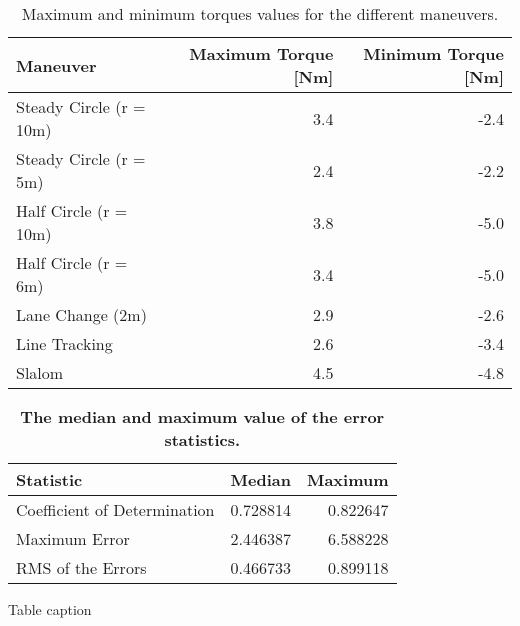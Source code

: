 \documentclass[10pt]{article}
\begin{document}
\begin{table}[!ht]
  \caption{Maximum and minimum torques values for the different maneuvers.}
  \begin{tabular}{lrr}
    Maneuver & Maximum Torque [Nm] & Minimum Torque [Nm] \\
    \hline
    Steady Circle (r = 10m) & 3.4 & -2.4 \\
    Steady Circle (r = 5m) & 2.4 & -2.2 \\
    Half Circle (r = 10m) & 3.8 & -5.0 \\
    Half Circle (r = 6m) & 3.4 & -5.0 \\
    Lane Change (2m) & 2.9 & -2.6 \\
    Line Tracking & 2.6 & -3.4 \\
    Slalom & 4.5 & -4.8
  \end{tabular}
  \label{tab:maneuver-torque-values}
\end{table}

\begin{table}[!ht]
  \caption{{\bf The median and maximum value of the error statistics.}}
  \centering
  \begin{tabular}{lrr}
    \hline
    Statistic                    & Median   & Maximum \\
    \hline
    Coefficient of Determination & 0.728814 & 0.822647 \\
    Maximum Error                & 2.446387 & 6.588228 \\
    RMS of the Errors            & 0.466733 & 0.899118
  \end{tabular}
  \begin{flushleft}
    Table caption
  \end{flushleft}
  \label{tab:medians}
\end{table}
\end{document}
